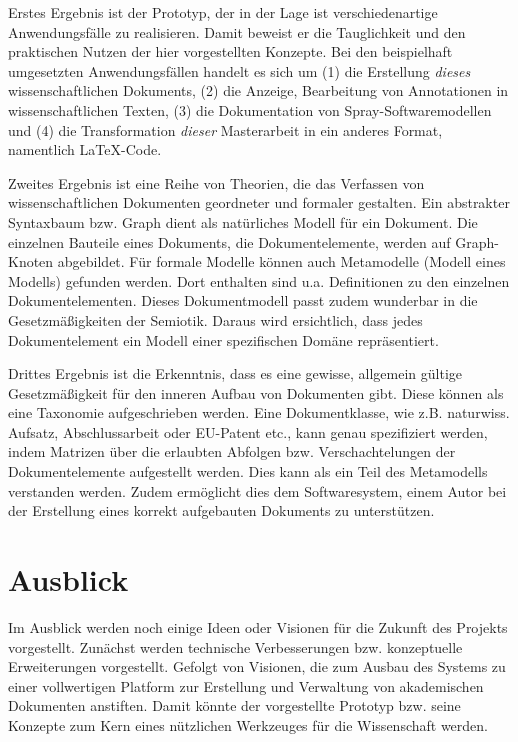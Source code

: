 Erstes Ergebnis ist der Prototyp, der in der Lage ist verschiedenartige Anwendungsfälle zu realisieren. Damit beweist er die Tauglichkeit und den praktischen Nutzen der hier vorgestellten Konzepte. Bei den beispielhaft umgesetzten Anwendungsfällen handelt es sich um (1) die Erstellung \emph{dieses} wissenschaftlichen Dokuments, (2) die Anzeige, Bearbeitung von Annotationen in wissenschaftlichen Texten, (3) die Dokumentation von Spray-Softwaremodellen und (4) die Transformation \emph{dieser} Masterarbeit in ein anderes Format, namentlich LaTeX-Code.

 
Zweites Ergebnis ist eine Reihe von Theorien, die das Verfassen von wissenschaftlichen Dokumenten geordneter und formaler gestalten. Ein abstrakter Syntaxbaum bzw. Graph dient als natürliches Modell für ein Dokument. Die einzelnen Bauteile eines Dokuments, die Dokumentelemente, werden auf Graph-Knoten abgebildet. Für formale Modelle können auch Metamodelle (Modell eines Modells) gefunden werden. Dort enthalten sind u.a. Definitionen zu den einzelnen Dokumentelementen. Dieses Dokumentmodell passt zudem wunderbar in die Gesetzmäßigkeiten der Semiotik. Daraus wird ersichtlich, dass jedes Dokumentelement ein Modell einer spezifischen Domäne repräsentiert.

 
Drittes Ergebnis ist die Erkenntnis, dass es eine gewisse, allgemein gültige Gesetzmäßigkeit für den inneren Aufbau von Dokumenten gibt. Diese können als eine Taxonomie aufgeschrieben werden. Eine Dokumentklasse, wie z.B. naturwiss. Aufsatz, Abschlussarbeit oder EU-Patent etc., kann genau spezifiziert werden, indem Matrizen über die erlaubten Abfolgen bzw. Verschachtelungen der Dokumentelemente aufgestellt werden. Dies kann als ein Teil des Metamodells verstanden werden. Zudem ermöglicht dies dem Softwaresystem, einem Autor bei der Erstellung eines korrekt aufgebauten Dokuments zu unterstützen.

 
\section{Ausblick}\label{}
 
Im Ausblick werden noch einige Ideen oder Visionen für die Zukunft des Projekts vorgestellt. Zunächst werden technische Verbesserungen bzw. konzeptuelle Erweiterungen vorgestellt. Gefolgt von Visionen, die zum Ausbau des Systems zu einer vollwertigen Platform zur Erstellung und Verwaltung von akademischen Dokumenten anstiften. Damit könnte der vorgestellte Prototyp bzw. seine Konzepte zum Kern eines nützlichen Werkzeuges für die Wissenschaft werden.

